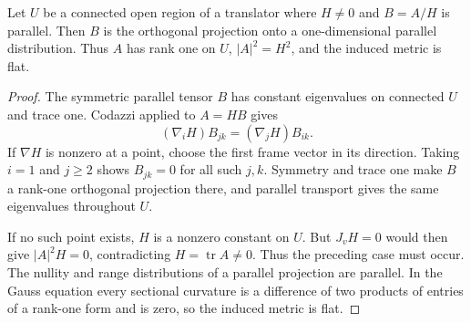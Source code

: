\begin{lemma}\label{lem:translator-parallel-shape-rank-one}
Let $U$ be a connected open region of a translator where $H\ne0$ and $B=A/H$ is parallel. Then $B$ is the orthogonal projection onto a one-dimensional parallel distribution. Thus $A$ has rank one on $U$, $|A|^2=H^2$, and the induced metric is flat.
\end{lemma}
\begin{proof}
The symmetric parallel tensor $B$ has constant eigenvalues on connected $U$ and trace one. Codazzi applied to $A=HB$ gives
\[
 (\nabla_iH)B_{jk}=(\nabla_jH)B_{ik}.
\]
If $\nabla H$ is nonzero at a point, choose the first frame vector in its direction. Taking $i=1$ and $j\ge2$ shows $B_{jk}=0$ for all such $j,k$. Symmetry and trace one make $B$ a rank-one orthogonal projection there, and parallel transport gives the same eigenvalues throughout $U$.

If no such point exists, $H$ is a nonzero constant on $U$. But $J_vH=0$ would then give $|A|^2H=0$, contradicting $H=\operatorname{tr}A\ne0$. Thus the preceding case must occur. The nullity and range distributions of a parallel projection are parallel. In the Gauss equation every sectional curvature is a difference of two products of entries of a rank-one form and is zero, so the induced metric is flat.
\end{proof}

